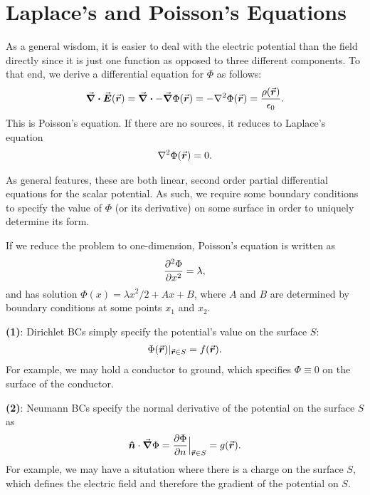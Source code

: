 \chapter{Laplace's and Poisson's Equations}

As a general wisdom, it is easier to deal with the electric potential than the field directly since it is just one function as opposed to three different components.
To that end, we derive a differential equation for $\Phi$ as follows:
\begin{eqnarray}
    \div{\va*{E}(\va*{r})} = \div{-\grad \Phi(\va*{r})} = -\laplacian \Phi(\va*{r}) = \frac{\rho(\va*{r})}{\epsilon_0}
.\end{eqnarray}
This is Poisson's equation.
If there are no sources, it reduces to Laplace's equation
\begin{eqnarray}
    \laplacian \Phi(\va*{r}) = 0
.\end{eqnarray}

As general features, these are both linear, second order partial differential equations for the scalar potential.
As such, we require some boundary conditions to specify the value of $\Phi$ (or its derivative) on some surface in order to uniquely determine its form.

If we reduce the problem to one-dimension, Poisson's equation is written as
\begin{eqnarray}
    \pdv[2]{\Phi}{x} = \lambda
,\end{eqnarray}
and has solution $\Phi(x) = \lambda x^2 / 2 + Ax + B$, where $A$ and $B$ are determined by boundary conditions at some points $x_1$ and $x_2$.

\textbf{(1)}: Dirichlet BCs simply specify the potential's value on the surface $S$:
\begin{eqnarray}
    \Phi(\va*{r})|_{\va*{r} \in S} = f(\va*{r})
.\end{eqnarray}
For example, we may hold a conductor to ground, which specifies $\Phi \equiv 0$ on the surface of the conductor.

\textbf{(2)}: Neumann BCs specify the normal derivative of the potential on the surface $S$ as 
\begin{eqnarray}
    \vu*{n} \cdot \grad \Phi = \pdv{\Phi}{n}\Big|_{\va*{r} \in S} = g(\va*{r})
.\end{eqnarray}
For example, we may have a situtation where there is a charge on the surface $S$, which defines the electric field and therefore the gradient of the potential on $S$.









